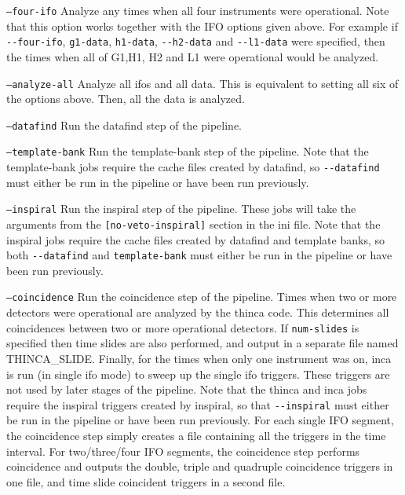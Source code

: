 \begin{entry}
\begin{entry}
\item[\texttt{--four-ifo}] Analyze any times when all four instruments were
operational.  Note that this option works together with the IFO options given
above.  For example if \verb$--four-ifo$, \verb$g1-data$, \verb$h1-data$,
\verb$--h2-data$ and \verb$--l1-data$ were specified, then the times when all
of G1,H1, H2 and L1 were operational would be analyzed.
\end{entry}

\begin{entry}
\item[\texttt{--analyze-all}] Analyze all ifos and all data.  This is
equivalent to setting all six of the options above.  Then, all the data is
analyzed.
\end{entry}

\begin{entry}
\item[\texttt{--datafind}] Run the datafind step of the pipeline.
\end{entry}

\begin{entry}
\item[\texttt{--template-bank}] Run the template-bank step of the pipeline.
Note that the template-bank jobs require the cache files created by datafind,
so \verb$--datafind$ must either be run in the pipeline or have been run
previously.
\end{entry}

\begin{entry}
\item[\texttt{--inspiral}] Run the inspiral step of the pipeline.  These jobs
will take the arguments from the \verb$[no-veto-inspiral]$ section in the ini
file.  Note that the inspiral jobs require the cache files created by datafind
and template banks, so both \verb$--datafind$ and \verb$template-bank$ must
either be run in the pipeline or have been run previously.
\end{entry}

\begin{entry} 
\item[\texttt{--coincidence}] Run the coincidence step of the pipeline.  Times
when two or more detectors were operational are analyzed by the thinca code.
This determines all coincidences between two or more operational detectors.
If \verb$num-slides$ is specified then time slides are also performed, and
output in a separate file named THINCA\_SLIDE.  Finally, for the times when
only one instrument was on, inca is run (in single ifo mode) to sweep up the
single ifo triggers.  These triggers are not used by later stages of the
pipeline.  Note that the thinca and inca jobs require the inspiral triggers
created by inspiral, so that \verb$--inspiral$ must either be run in the
pipeline or have been run previously.  For each single IFO segment, the
coincidence step simply creates a file containing all the triggers in the time
interval.  For two/three/four IFO segments, the coincidence step performs
coincidence and outputs the double, triple and quadruple coincidence triggers
in one file, and time slide coincident triggers in a second file.
\end{entry} 


\end{entry}
